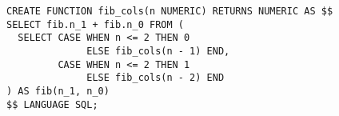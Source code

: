 \begin{verbatim}
CREATE FUNCTION fib_cols(n NUMERIC) RETURNS NUMERIC AS $$
SELECT fib.n_1 + fib.n_0 FROM (
  SELECT CASE WHEN n <= 2 THEN 0
              ELSE fib_cols(n - 1) END,
         CASE WHEN n <= 2 THEN 1
              ELSE fib_cols(n - 2) END
) AS fib(n_1, n_0)
$$ LANGUAGE SQL;
\end{verbatim}